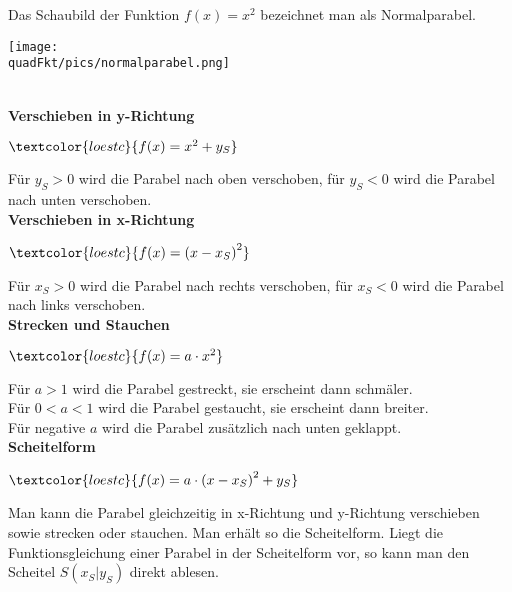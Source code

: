 \begin{minipage}{0.49\textwidth}\centering
	\textcolor{loes}{Das Schaubild der Funktion}\newline
	\textcolor{loes}{$f(x)=x^2$}\newline
	\textcolor{loes}{bezeichnet man als Normalparabel.}
\end{minipage}
\begin{minipage}{0.49\textwidth}
	\texttt{[image: \\quadFkt/pics/normalparabel.png]}
\end{minipage}\\
\textbf{Verschieben in y-Richtung}
\begin{tcolorbox}\centering
	$\textcolor{loestc}{f(x)=x^2+y_S}$
\end{tcolorbox}
\textcolor{loes}{Für $y_S>0$ wird die Parabel nach oben verschoben, für $y_S<0$ wird die Parabel nach unten verschoben.}\\
\textbf{Verschieben in x-Richtung}
\begin{tcolorbox}\centering
	$\textcolor{loestc}{f(x)=\left(x-x_S\right)^2}$
\end{tcolorbox}
\textcolor{loes}{Für $x_S>0$ wird die Parabel nach rechts verschoben, für $x_S<0$ wird die Parabel nach links verschoben.}\\
\textbf{Strecken und Stauchen}
\begin{tcolorbox}\centering
	$\textcolor{loestc}{f(x)=a\cdot x^2}$
\end{tcolorbox}
\textcolor{loes}{Für $a>1$ wird die Parabel gestreckt, sie erscheint dann schmäler.}\\
\textcolor{loes}{Für $0<a<1$ wird die Parabel gestaucht, sie erscheint dann breiter.}\\
\textcolor{loes}{Für negative $a$ wird die Parabel zusätzlich nach unten geklappt.}\\
\textbf{Scheitelform}
\begin{tcolorbox}\centering
	$\textcolor{loestc}{f(x)=a\cdot \left(x-x_S\right)^2+y_S}$
\end{tcolorbox}
\textcolor{loes}{Man kann die Parabel gleichzeitig in x-Richtung und y-Richtung verschieben sowie strecken oder stauchen. Man erhält so die Scheitelform. Liegt die Funktionsgleichung einer Parabel in der Scheitelform vor, so kann man den Scheitel $S\left(x_S\vert y_S \right)$ direkt ablesen.}\newpage
